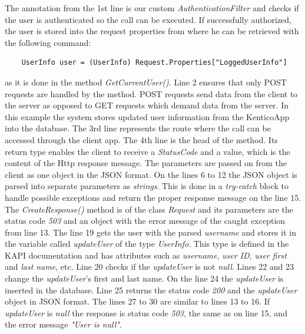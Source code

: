 The annotation from the 1st line is our custom \textit{AuthenticationFilter} and checks if the user is authenticated so the call can be executed. If successfully authorized, the user is stored into the request properties from where he can be retrieved with the following command:
\lstset{style=sharpc, numbers = none}
\begin{lstlisting}
	UserInfo user = (UserInfo) Request.Properties["LoggedUserInfo"]
\end{lstlisting}
as it is done in the method \textit{GetCurrentUser()}.
Line 2 ensures that only POST requests are handled by the method. POST requests send data from the client to the server as opposed to GET requests which demand data from the server. In this example the system stores updated user information from the KenticoApp into the database. The 3rd line represents the route where the call can be accessed through the client app. The 4th line is the head of the method. Its return type enables the client to receive a \textit{StatusCode} and a value, which is the content of the Http response message. The parameters are passed on from the client as one object in the JSON format. On the lines 6 to 12 the JSON object is parsed into separate parameters as \textit{strings}. This is done in a \textit{try-catch} block to handle possible exceptions and return the proper response message on the line 15. The \textit{CreateResponse()} method is of the class \textit{Request} and its parameters are the status code \textit{503} and an object with the error message of the caught exception from line 13. The line 19 gets the user with the parsed \textit{username} and stores it in the variable called \textit{updateUser} of the type \textit{UserInfo}. This type is defined in the KAPI documentation and has attributes such as \textit{username}, \textit{user ID}, \textit{user first} and \textit{last name}, etc. Line 20 checks if the \textit{updateUser} is not \textit{null}. Lines 22 and 23 change the \textit{updateUser}'s first and last name. On the line 24 the \textit{updateUser} is inserted in the database. Line 25 returns the status code \textit{200} and the \textit{updateUser} object in JSON format. The lines 27 to 30 are similar to lines 13 to 16. If \textit{updateUser} is \textit{null} the response is status code \textit{503}, the same as on line 15, and the error message \textit{"User is null"}. 

